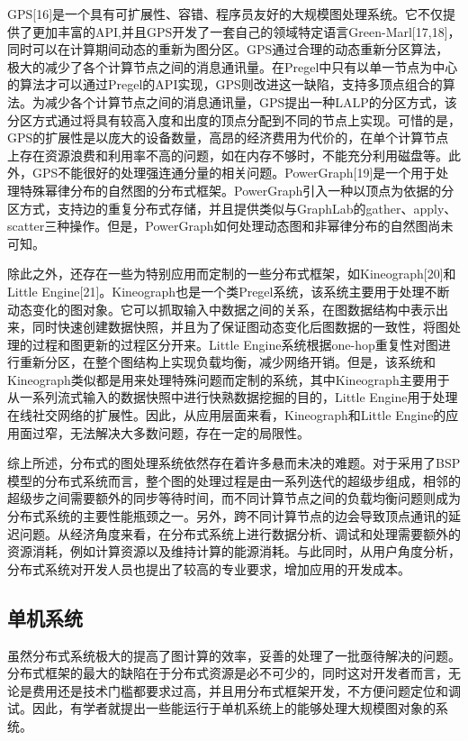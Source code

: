 GPS[16]是一个具有可扩展性、容错、程序员友好的大规模图处理系统。它不仅提供了更加丰富的API,并且GPS开发了一套自己的领域特定语言Green-Marl[17,18]，同时可以在计算期间动态的重新为图分区。GPS通过合理的动态重新分区算法，极大的减少了各个计算节点之间的消息通讯量。在Pregel中只有以单一节点为中心的算法才可以通过Pregel的API实现，GPS则改进这一缺陷，支持多顶点组合的算法。为减少各个计算节点之间的消息通讯量，GPS提出一种LALP的分区方式，该分区方式通过将具有较高入度和出度的顶点分配到不同的节点上实现。可惜的是，GPS的扩展性是以庞大的设备数量，高昂的经济费用为代价的，在单个计算节点上存在资源浪费和利用率不高的问题，如在内存不够时，不能充分利用磁盘等。此外，GPS不能很好的处理强连通分量的相关问题。PowerGraph[19]是一个用于处理特殊幂律分布的自然图的分布式框架。PowerGraph引入一种以顶点为依据的分区方式，支持边的重复分布式存储，并且提供类似与GraphLab的gather、apply、scatter三种操作。但是，PowerGraph如何处理动态图和非幂律分布的自然图尚未可知。

除此之外，还存在一些为特别应用而定制的一些分布式框架，如Kineograph[20]和Little Engine[21]。Kineograph也是一个类Pregel系统，该系统主要用于处理不断动态变化的图对象。它可以抓取输入中数据之间的关系，在图数据结构中表示出来，同时快速创建数据快照，并且为了保证图动态变化后图数据的一致性，将图处理的过程和图更新的过程区分开来。Little Engine系统根据one-hop重复性对图进行重新分区，在整个图结构上实现负载均衡，减少网络开销。但是，该系统和Kineograph类似都是用来处理特殊问题而定制的系统，其中Kineograph主要用于从一系列流式输入的数据快照中进行快熟数据挖掘的目的，Little Engine用于处理在线社交网络的扩展性。因此，从应用层面来看，Kineograph和Little Engine的应用面过窄，无法解决大多数问题，存在一定的局限性。

综上所述，分布式的图处理系统依然存在着许多悬而未决的难题。对于采用了BSP模型的分布式系统而言，整个图的处理过程是由一系列迭代的超级步组成，相邻的超级步之间需要额外的同步等待时间，而不同计算节点之间的负载均衡问题则成为分布式系统的主要性能瓶颈之一。另外，跨不同计算节点的边会导致顶点通讯的延迟问题。从经济角度来看，在分布式系统上进行数据分析、调试和处理需要额外的资源消耗，例如计算资源以及维持计算的能源消耗。与此同时，从用户角度分析，分布式系统对开发人员也提出了较高的专业要求，增加应用的开发成本。

\subsection{单机系统}

虽然分布式系统极大的提高了图计算的效率，妥善的处理了一批亟待解决的问题。分布式框架的最大的缺陷在于分布式资源是必不可少的，同时这对开发者而言，无论是费用还是技术门槛都要求过高，并且用分布式框架开发，不方便问题定位和调试。因此，有学者就提出一些能运行于单机系统上的能够处理大规模图对象的系统。

